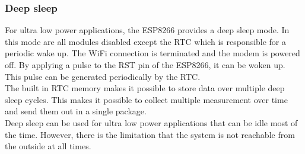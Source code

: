 \subsubsection{Deep sleep}
For ultra low power applications, the ESP8266 provides a deep sleep mode.
In this mode are all modules disabled except the RTC which is responsible for a periodic wake up.
The WiFi connection is terminated and the modem is powered off. By applying a pulse to the RST pin of the ESP8266, it can be woken up.
This pulse can be generated periodically by the RTC.\\
The built in RTC memory makes it possible to store data over multiple deep sleep cycles.
This makes it possible to collect multiple measurement over time and send them out in a single package.\\
Deep sleep can be used for ultra low power applications that can be idle most of the time. 
However, there is the limitation that the system is not reachable from the outside at all times. \cite{espressif_inc_esp8266_2016}